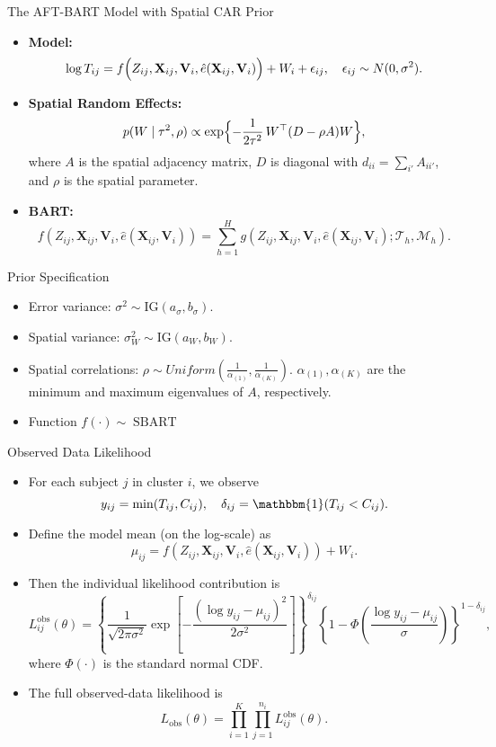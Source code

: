 \documentclass{beamer}
\begin{document}
\begin{frame}{The AFT-BART Model with Spatial CAR Prior}
  \begin{itemize}
    \item \textbf{Model:} 
      \[
      \log T_{ij} = f\Bigl(Z_{ij},\mathbf{X}_{ij},\mathbf{V}_i,\hat{e}(\mathbf{X}_{ij},\mathbf{V}_i)\Bigr) + W_i + \epsilon_{ij},\quad \epsilon_{ij}\sim N(0,\sigma^2).
      \]
    \item \textbf{Spatial Random Effects:} 
      \[
      p(W\mid \tau^2,\rho) \propto \exp\Bigl\{-\frac{1}{2\tau^2}\,W^\top (D-\rho A)W\Bigr\},
      \]
      where \(A\) is the spatial adjacency matrix, \(D\) is diagonal with \(d_{ii}=\sum_{i'}A_{ii'}\), and \(\rho\) is the spatial parameter.
    \item \textbf{BART:} 
      \[
      f(Z_{ij},\mathbf{X}_{ij},\mathbf{V}_i,\hat{e}(\mathbf{X}_{ij},\mathbf{V}_i))=\sum_{h=1}^{H} g(Z_{ij},\mathbf{X}_{ij},\mathbf{V}_i,\hat{e}(\mathbf{X}_{ij},\mathbf{V}_i);\mathcal{T}_h,\mathcal{M}_h).
      \]
  \end{itemize}
\end{frame}

\begin{frame}{Prior Specification}
  \begin{itemize}
    \item Error variance: \( \sigma^2 \sim \mathrm{IG}(a_\sigma,b_\sigma) \).
    \item Spatial variance: \( \sigma_W^2 \sim \mathrm{IG}(a_W,b_W) \).
    \item Spatial correlations: \(\rho \sim Uniform(\frac{1}{\alpha_{(1)}},\frac{1}{\alpha_{(K)}})\). \(\alpha_{(1)},\alpha_{(K)}\) are the minimum and maximum eigenvalues of \(A\), respectively.
    \item Function \( f(\cdot) \sim \operatorname{SBART}\)
  \end{itemize}
\end{frame}

\begin{frame}{Observed Data Likelihood}
  \begin{itemize}
    \item For each subject \(j\) in cluster \(i\), we observe
      \[
      y_{ij} = \min(T_{ij}, C_{ij}), \quad \delta_{ij} = \mathbbm{1}(T_{ij} < C_{ij}).
      \]
    \item Define the model mean (on the log-scale) as
      \[
      \mu_{ij} = f(Z_{ij}, \mathbf{X}_{ij}, \mathbf{V}_i, \hat{e}(\mathbf{X}_{ij},\mathbf{V}_i)) + W_i.
      \]
    \item Then the individual likelihood contribution is
      \[
      L_{ij}^{\text{obs}}(\theta) = \left\{ \frac{1}{\sqrt{2\pi\sigma^2}}
      \exp\!\left[-\frac{(\log y_{ij} - \mu_{ij})^2}{2\sigma^2}\right] \right\}^{\delta_{ij}}
      \left\{ 1 - \Phi\!\left(\frac{\log y_{ij} - \mu_{ij}}{\sigma}\right) \right\}^{1-\delta_{ij}},
      \]
      where \(\Phi(\cdot)\) is the standard normal CDF.
    \item The full observed-data likelihood is
      \[
      L_{\text{obs}}(\theta) = \prod_{i=1}^K \prod_{j=1}^{n_i} L_{ij}^{\text{obs}}(\theta).
      \]
  \end{itemize}
\end{frame}
\end{document}
